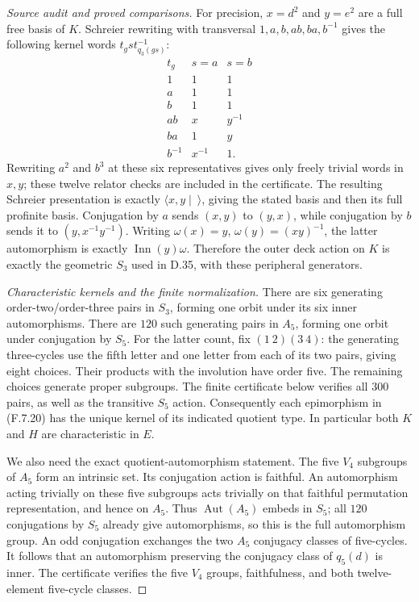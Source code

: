 \begin{proof}[Source audit and proved comparisons]
For precision, $x=d^2$ and $y=e^2$ are a full free basis
of $K$.  Schreier rewriting with transversal
$1,a,b,ab,ba,b^{-1}$ gives the following kernel words
$t_g s t_{q_3(gs)}^{-1}$:
\[
 \begin{array}{c|cc}
 t_g&s=a&s=b\\ \hline
 1&1&1\\ a&1&1\\ b&1&1\\
 ab&x&y^{-1}\\ ba&1&y\\ b^{-1}&x^{-1}&1 .
 \end{array}                                             \tag{F.7.22}
\]
Rewriting $a^2$ and $b^3$ at these six representatives
gives only freely trivial words in $x,y$; these twelve
relator checks are included in the certificate.
The resulting Schreier presentation is exactly
$\langle x,y\mid\ \rangle$, giving the stated basis
and then its full profinite basis.  Conjugation by $a$ sends
$(x,y)$ to $(y,x)$, while conjugation by $b$ sends it
to $(y,x^{-1}y^{-1})$.  Writing
$\omega(x)=y$, $\omega(y)=(xy)^{-1}$, the latter
automorphism is exactly $\operatorname{Inn}(y)\omega$.
Therefore the outer
deck action on $K$ is exactly the geometric $S_3$
used in D.35, with these peripheral generators.

\emph{Characteristic kernels and the finite normalization.}
There are six generating order-two/order-three pairs in
$S_3$, forming one orbit under its six inner automorphisms.
There are $120$ such generating pairs in $A_5$, forming
one orbit under conjugation by $S_5$.
For the latter count, fix $(1\ 2)(3\ 4)$: the generating
three-cycles use the fifth letter and one letter from
each of its two pairs, giving eight choices.
Their products with the involution have order five.
The remaining choices generate proper subgroups.
The finite certificate below verifies all $300$ pairs,
as well as the transitive $S_5$ action.
Consequently each epimorphism in (F.7.20) has the unique
kernel of its indicated quotient type.  In particular
both $K$ and $H$ are characteristic in $E$.

We also need the exact quotient-automorphism statement.
The five $V_4$ subgroups of $A_5$ form an intrinsic set.
Its conjugation action is faithful.  An automorphism
acting trivially on these five subgroups acts trivially
on that faithful permutation representation, and hence
on $A_5$.  Thus $\operatorname{Aut}(A_5)$ embeds in $S_5$;
all $120$ conjugations by $S_5$ already give automorphisms,
so this is the full automorphism group.  An odd
conjugation exchanges the two $A_5$ conjugacy classes
of five-cycles.  It follows that an automorphism
preserving the conjugacy class of $q_5(d)$ is inner.
The certificate verifies the five $V_4$ groups,
faithfulness, and both twelve-element five-cycle classes.


\end{proof}
